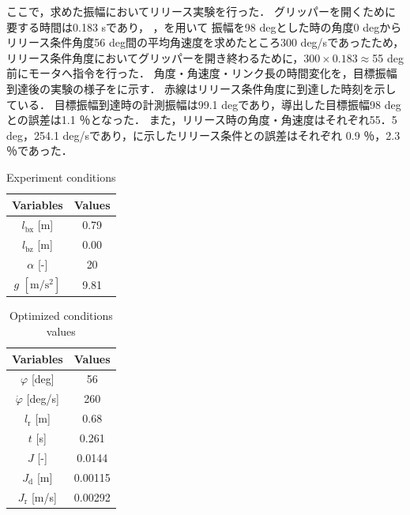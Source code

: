           ここで，求めた振幅においてリリース実験を行った．
          グリッパーを開くために要する時間は0.183 sであり，
          ，を用いて
          振幅を98 degとした時の角度0 degからリリース条件角度56 deg間の平均角速度を求めたところ300 deg/sであったため，
          リリース条件角度においてグリッパーを開き終わるために，$300\times0.183\approx$55 deg前にモータへ指令を行った．
          角度・角速度・リンク長の時間変化を，目標振幅到達後の実験の様子をに示す．
          赤線はリリース条件角度に到達した時刻を示している．
          目標振幅到達時の計測振幅は99.1 degであり，導出した目標振幅98 degとの誤差は1.1 ％となった．
          また，リリース時の角度・角速度はそれぞれ55．5 deg，254.1 deg/sであり，に示したリリース条件との誤差はそれぞれ
          0.9 ％，2.3 ％であった．
          \begin{table}[tb]
            \begin{center}
              \caption{Experiment conditions}
              \vspace{2mm}
              \begin{tabular}{c|c}
                \hline
                Variables & Values \\
                \hline
                $l_{\mathrm{bx}}$ [m] & 0.79 \\
                $l_{\mathrm{bz}}$ [m] & 0.00 \\
                $\alpha$ [-]& 20 \\
                $g$ $\mathrm{[m/s^2]}$ & 9.81 \\
                \hline
              \end{tabular}
            \end{center}
          \end{table}
          \begin{table}[tb]
            \begin{center}
              \caption{Optimized conditions values}
              \vspace{2mm}
              \begin{tabular}{c|c}
                \hline
                Variables & Values \\
                \hline
                $\varphi$ [deg] & 56 \\
                $\dot{\varphi}$ [deg/s] & 260 \\
                $l_{\mathrm{r}}$ [m] & 0.68 \\
                $t$ [s] & 0.261 \\
                $J$ [-] & 0.0144 \\
                $J_{\mathrm{d}}$ [m] & 0.00115 \\
                $J_{\mathrm{r}}$ [m/s] & 0.00292 \\
                \hline
              \end{tabular}
            \end{center}
          \end{table}
